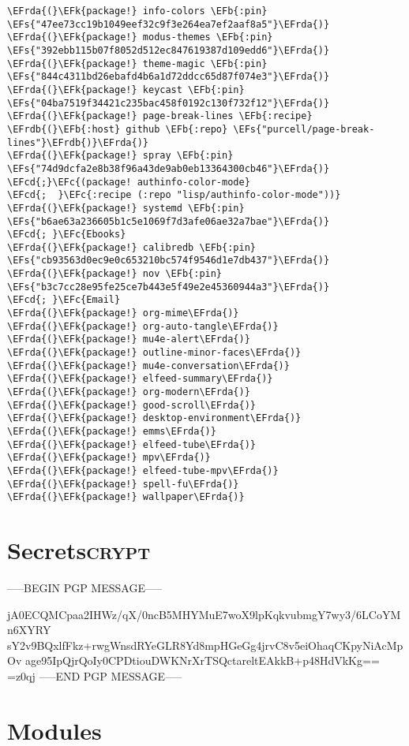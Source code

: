 \documentclass[a4wide,10pt]{article}
\newcommand{\EFc}[1]{\textcolor{EFc}{#1}} %
\newcommand{\EFcd}[1]{\textcolor{EFcd}{#1}} %
\newcommand{\EFs}[1]{\textcolor{EFs}{#1}} %
\newcommand{\EFk}[1]{\textcolor{EFk}{#1}} %
\newcommand{\EFb}[1]{\textcolor{EFb}{#1}} %
\newcommand{\EFrda}[1]{\textcolor{EFrda}{#1}} %
\newcommand{\EFrdb}[1]{\textcolor{EFrdb}{#1}} %
\begin{document}
\begin{Code}
\begin{Verbatim}
\EFrda{(}\EFk{package!} info-colors \EFb{:pin} \EFs{"47ee73cc19b1049eef32c9f3e264ea7ef2aaf8a5"}\EFrda{)}
\EFrda{(}\EFk{package!} modus-themes \EFb{:pin} \EFs{"392ebb115b07f8052d512ec847619387d109edd6"}\EFrda{)}
\EFrda{(}\EFk{package!} theme-magic \EFb{:pin} \EFs{"844c4311bd26ebafd4b6a1d72ddcc65d87f074e3"}\EFrda{)}
\EFrda{(}\EFk{package!} keycast \EFb{:pin} \EFs{"04ba7519f34421c235bac458f0192c130f732f12"}\EFrda{)}
\EFrda{(}\EFk{package!} page-break-lines \EFb{:recipe} \EFrdb{(}\EFb{:host} github \EFb{:repo} \EFs{"purcell/page-break-lines"}\EFrdb{)}\EFrda{)}
\EFrda{(}\EFk{package!} spray \EFb{:pin} \EFs{"74d9dcfa2e8b38f96a43de9ab0eb13364300cb46"}\EFrda{)}
\EFcd{;}\EFc{(package! authinfo-color-mode}
\EFcd{;  }\EFc{:recipe (:repo "lisp/authinfo-color-mode"))}
\EFrda{(}\EFk{package!} systemd \EFb{:pin} \EFs{"b6ae63a236605b1c5e1069f7d3afe06ae32a7bae"}\EFrda{)}
\EFcd{; }\EFc{Ebooks}
\EFrda{(}\EFk{package!} calibredb \EFb{:pin} \EFs{"cb93563d0ec9e0c653210bc574f9546d1e7db437"}\EFrda{)}
\EFrda{(}\EFk{package!} nov \EFb{:pin} \EFs{"b3c7cc28e95fe25ce7b443e5f49e2e45360944a3"}\EFrda{)}
\EFcd{; }\EFc{Email}
\EFrda{(}\EFk{package!} org-mime\EFrda{)}
\EFrda{(}\EFk{package!} org-auto-tangle\EFrda{)}
\EFrda{(}\EFk{package!} mu4e-alert\EFrda{)}
\EFrda{(}\EFk{package!} outline-minor-faces\EFrda{)}
\EFrda{(}\EFk{package!} mu4e-conversation\EFrda{)}
\EFrda{(}\EFk{package!} elfeed-summary\EFrda{)}
\EFrda{(}\EFk{package!} org-modern\EFrda{)}
\EFrda{(}\EFk{package!} good-scroll\EFrda{)}
\EFrda{(}\EFk{package!} desktop-environment\EFrda{)}
\EFrda{(}\EFk{package!} emms\EFrda{)}
\EFrda{(}\EFk{package!} elfeed-tube\EFrda{)}
\EFrda{(}\EFk{package!} mpv\EFrda{)}
\EFrda{(}\EFk{package!} elfeed-tube-mpv\EFrda{)}
\EFrda{(}\EFk{package!} spell-fu\EFrda{)}
\EFrda{(}\EFk{package!} wallpaper\EFrda{)}
\end{Verbatim}
\end{Code}
\section{Secrets\hfill{}\textsc{crypt}}
\label{sec:org63fc93c}
-----BEGIN PGP MESSAGE-----

jA0ECQMCpaa2IHWz/qX/0ncB5MHYMuE7woX9lpKqkvubmgY7wy3/6LCoYMn6XYRY
sY2v9BQxlfFkz+rwgWnsdRYeGLR8Yd8mpHGeGg4jrvC8v5eiOhaqCKpyNiAcMpOv
age95IpQjrQoIy0CPDtiouDWKNrXrTSQctareltEAkkB+p48HdVkKg==
=z0qj
-----END PGP MESSAGE-----
\section{Modules}
\label{sec:orgd2c78e6}
\end{document}
